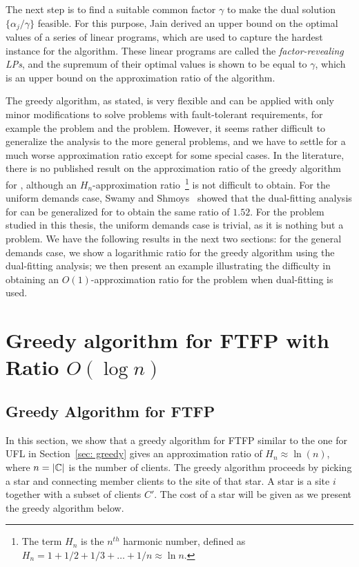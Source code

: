 \documentclass[oneside,final]{ucr}
\begin{document}
The next step is to find a suitable common factor $\gamma$
to make the dual solution $\{\alpha_j / \gamma\}$
feasible. For this purpose, Jain {\etal} derived an upper
bound on the optimal values of a series of linear programs,
which are used to capture the hardest instance for the
algorithm. These linear programs are called the
\emph{factor-revealing LPs}, and the supremum of their
optimal values is shown to be equal to $\gamma$, which is an
upper bound on the approximation ratio of the algorithm.

The greedy algorithm, as stated, is very flexible and can be
applied with only minor modifications to solve problems with
fault-tolerant requirements, for example the {\FTFL} problem
and the {\FTFP} problem. However, it seems rather difficult
to generalize the analysis to the more general problems, and
we have to settle for a much worse approximation ratio
except for some special cases. In the literature, there is
no published result on the approximation ratio of the greedy
algorithm for {\FTFL}, although an $H_n$-approximation
ratio~\footnote{The term $H_n$ is the $n^{th}$ harmonic
  number, defined as $H_n = 1 + 1/2 + 1/3 + \ldots + 1/n
  \approx \ln n$.} is not difficult to obtain. For the
uniform demands case, Swamy and Shmoys~\cite{SwamyS08}
showed that the dual-fitting analysis for {\UFL} can be
generalized for {\FTFL} to obtain the same ratio of
$1.52$. For the {\FTFP} problem studied in this thesis, the
uniform demands case is trivial, as it is nothing but a
{\UFL} problem. We have the following results in the next
two sections: for the general demands case, we show a
logarithmic ratio for the greedy algorithm using the
dual-fitting analysis; we then present an example
illustrating the difficulty in obtaining an
$O(1)$-approximation ratio for the {\FTFP} problem when
dual-fitting is used.

\section{Greedy algorithm for FTFP with Ratio $O(\log n)$}
\label{sec: greedy_ratio}

\subsection{Greedy Algorithm for FTFP}
In this section, we show that a greedy algorithm for FTFP
similar to the one for UFL in Section~\ref{sec: greedy}
gives an approximation ratio of $H_n \approx \ln(n)$, where
$n=|\mathbb{C}|$ is the number of clients. The greedy
algorithm proceeds by picking a star and connecting member
clients to the site of that star. A star is a site $i$
together with a subset of clients $C'$. The cost of a star
will be given as we present the greedy algorithm below.
\end{document}
